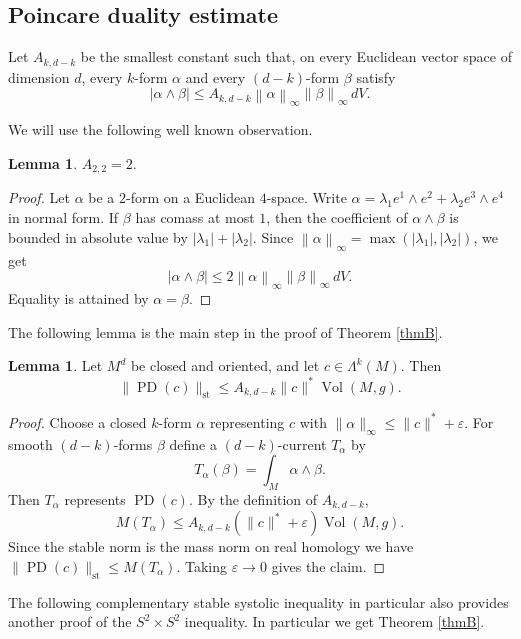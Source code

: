 \documentclass[11pt,reqno]{amsart}
\numberwithin{equation}{section}
\numberwithin{equation}{section}
\theoremstyle{definition}
\newtheorem{lemma}[theorem]{Lemma}
\newcommand{\norm}[1]{\left\lVert #1\right\rVert}
\begin{document}
\subsection{Poincare duality estimate}

Let \(A_{k,d-k}\) be the smallest constant such that, on every Euclidean vector space of dimension \(d\), every \(k\)-form \(\alpha\) and every \((d-k)\)-form \(\beta\) satisfy
\[
|\alpha\wedge\beta|
\le
A_{k,d-k}
\norm{\alpha}_{\infty}
\norm{\beta}_{\infty}
\,dV.
\]

We will use the following well known observation. 
\begin{lemma}\label{lem:A22}
\(A_{2,2}=2\).
\end{lemma}

\begin{proof}
Let \(\alpha\) be a \(2\)-form on a Euclidean \(4\)-space. Write \(\alpha=\lambda_1 e^1\wedge e^2 +\lambda_2 e^3\wedge e^4\) in normal form. If \(\beta\) has comass at most \(1\), then the coefficient of \(\alpha\wedge\beta\) is bounded in absolute value by \(|\lambda_1|+|\lambda_2|\). Since \(\norm{\alpha}_\infty=\max(|\lambda_1|,|\lambda_2|)\), we get
\[
|\alpha\wedge\beta|
\le
2 \norm{\alpha}_\infty \norm{\beta}_\infty \,dV.
\]
Equality is attained by \(\alpha=\beta\).
\end{proof}

The following lemma is the main step in the proof of Theorem \ref{thmB}. 

\begin{lemma}\label{lem:pd-mass-estimate}
Let \(M^d\) be closed and oriented, and let \(c\in \Lambda^k(M)\). Then
\[
\|\operatorname{PD}(c)\|_{\mathrm{st}}
\le
A_{k,d-k}\|c\|^*\operatorname{Vol}(M,g).
\]
\end{lemma}

\begin{proof}
Choose a closed \(k\)-form \(\alpha\) representing \(c\) with \(\|\alpha\|_\infty\le \|c\|^*+\varepsilon.\) For smooth \((d-k)\)-forms \(\beta\) define a \((d-k)\)-current \(T_\alpha\) by
\[
T_\alpha(\beta)=\int_M \alpha\wedge\beta.
\]
 Then $T_{\alpha}$ represents \(\operatorname{PD}(c)\). By the definition of \(A_{k,d-k}\),
\[
M(T_\alpha)
\le
A_{k,d-k}(\|c\|^*+\varepsilon)\operatorname{Vol}(M,g).
\]
Since the stable norm is the mass norm on real homology we have \(\|\operatorname{PD}(c)\|_{\mathrm{st}}\le M(T_\alpha).\) Taking \(\varepsilon\to0\) gives the claim.
\end{proof}

The following complementary stable systolic inequality in particular also provides another proof of the $S^2 \times S^2$ inequality. In particular we get Theorem \ref{thmB}. 
\end{document}
